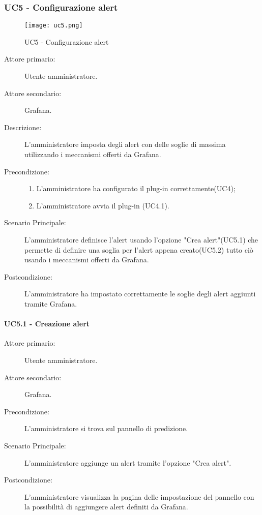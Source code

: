 \subsubsection{UC5 - Configurazione alert}
\label{sssec:uc5}

\begin{figure}[h!]
  \begin{center}
    \texttt{[image: uc5.png]}\\
    \caption{UC5 - Configurazione alert}%
    \label{fig:uc5}
  \end{center}
  \end{figure}

\begin{description}
	\item[Attore primario:] Utente amministratore.
	\item[Attore secondario:] Grafana.
	\item[Descrizione:] L'amministratore imposta degli alert con delle soglie di massima utilizzando i meccanismi offerti da Grafana.
	\item[Precondizione:]
	\begin{enumerate}
		\item L'amministratore ha configurato il plug-in correttamente(UC4);
		\item L'amministratore avvia il plug-in (UC4.1).
	\end {enumerate}
	\item[Scenario Principale:] L'amministratore definisce l'alert usando l'opzione "Crea alert"(UC5.1) che permette di definire una soglia per l'alert appena creato(UC5.2) tutto ciò usando i meccanismi offerti da Grafana.
	\item[Postcondizione:] L'amministratore ha impostato correttamente le soglie degli alert aggiunti tramite Grafana.
\end{description}

\paragraph{UC5.1 - Creazione alert}
\label{sssec:uc5.1}
\begin{description}
	\item[Attore primario:] Utente amministratore.
	\item[Attore secondario:] Grafana.
	\item[Precondizione:] L'amministratore si trova sul pannello di predizione.
	\item[Scenario Principale:] L'amministratore aggiunge un alert tramite l'opzione "Crea alert".
	\item[Postcondizione:] L'amministratore visualizza la pagina delle impostazione del pannello con la possibilità di aggiungere alert definiti da Grafana.
\end{description}

